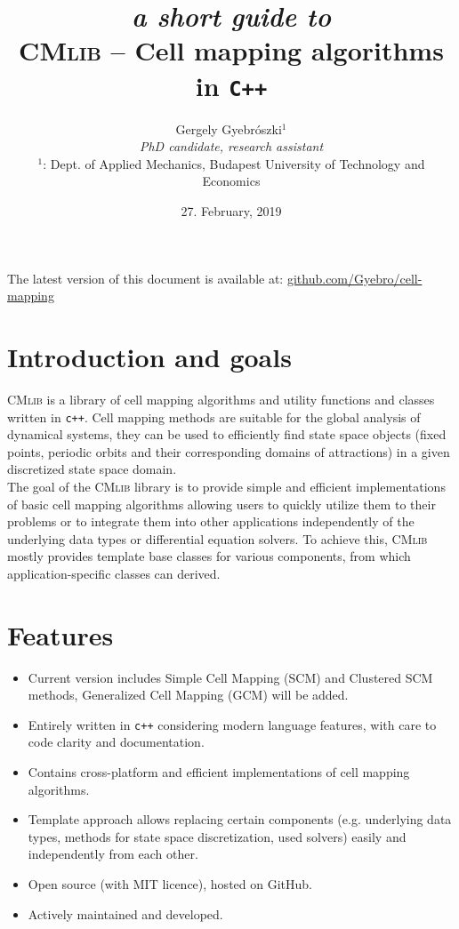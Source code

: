 \documentclass[11pt]{article}
\title{{\small \emph{a short guide to}\\}
\textsc{CMlib} -- Cell mapping algorithms in \texttt{C++}}
\author{Gergely Gyebrószki$^1$ \\
\emph{PhD candidate, research assistant} \\
$^1$: Dept. of Applied Mechanics, Budapest University of Technology and Economics
}
\date{27. February, 2019}
\begin{document}
\maketitle

{\small The latest version of this document is available at: \href{https://github.com/Gyebro/cell-mapping/blob/master/docs/tex/cell-mapping-cpp.pdf}{github.com/Gyebro/cell-mapping}}
	
\section{Introduction and goals}

\textsc{CMlib} is a library of cell mapping algorithms and utility functions and classes written in \texttt{c++}. 
Cell mapping methods are suitable for the global analysis of dynamical systems, they can be used to efficiently find state space objects (fixed points, periodic orbits and their corresponding domains of attractions) in a given discretized state space domain.\\
The goal of the \textsc{CMlib} library is to provide simple and efficient implementations of basic cell mapping algorithms allowing users to quickly utilize them to their problems or to integrate them into other applications independently of the underlying data types or differential equation solvers. To achieve this, \textsc{CMlib} mostly provides template base classes for various components, from which application-specific classes can derived.


\section{Features}

\begin{itemize}
	\item Current version includes Simple Cell Mapping (SCM) and Clustered SCM methods, Generalized Cell Mapping (GCM) will be added.
	\item Entirely written in \texttt{c++} considering modern language features, with care to code clarity and documentation.
	\item Contains cross-platform and efficient implementations of cell mapping algorithms.
	\item Template approach allows replacing certain components (e.g. underlying data types, methods for state space discretization, used solvers) easily and independently from each other.
	\item Open source (with MIT licence), hosted on GitHub.
	\item Actively maintained and developed.
\end{itemize}
\end{document}

